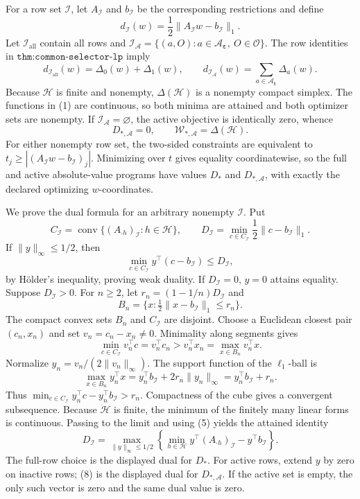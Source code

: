 For a row set \(\mathcal I\), let \(A_{\mathcal I}\) and \(b_{\mathcal I}\) be the corresponding restrictions and define
\[
d_{\mathcal I}(w)=\frac12\lVert A_{\mathcal I}w-b_{\mathcal I}\rVert_1.
\tag{1}
\]
Let \(\mathcal I_{\mathrm{all}}\) contain all rows and \(\mathcal I_{\mathcal A}=\{(a,O):a\in\mathcal A_{\boldsymbol\varepsilon},\ O\in\mathcal O\}\). The row identities in \(\texttt{thm:common-selector-lp}\) imply
\[
d_{\mathcal I_{\mathrm{all}}}(w)=\Delta_0(w)+\Delta_1(w),\qquad d_{\mathcal I_{\mathcal A}}(w)=\sum_{a\in\mathcal A_{\boldsymbol\varepsilon}}\Delta_a(w).
\tag{2}
\]
Because \(\mathcal H\) is finite and nonempty, \(\Delta(\mathcal H)\) is a nonempty compact simplex. The functions in (1) are continuous, so both minima are attained and both optimizer sets are nonempty. If \(\mathcal I_{\mathcal A}=\varnothing\), the active objective is identically zero, whence
\[
D_{*,\mathcal A}=0,\qquad \mathcal W_{*,\mathcal A}=\Delta(\mathcal H).
\tag{3}
\]
For either nonempty row set, the two-sided constraints are equivalent to \(t_j\ge |(A_{\mathcal I}w-b_{\mathcal I})_j|\). Minimizing over \(t\) gives equality coordinatewise, so the full and active absolute-value programs have values \(D_*\) and \(D_{*,\mathcal A}\), with exactly the declared optimizing \(w\)-coordinates.

We prove the dual formula for an arbitrary nonempty \(\mathcal I\). Put
\[
C_{\mathcal I}=\operatorname{conv}\{(A_{\cdot h})_{\mathcal I}:h\in\mathcal H\},\qquad D_{\mathcal I}=\min_{c\in C_{\mathcal I}}\frac12\lVert c-b_{\mathcal I}\rVert_1.
\tag{4}
\]
If \(\lVert y\rVert_\infty\le1/2\), then
\[
\min_{c\in C_{\mathcal I}}y^\top(c-b_{\mathcal I})\le D_{\mathcal I},
\tag{5}
\]
by Hölder's inequality, proving weak duality. If \(D_{\mathcal I}=0\), \(y=0\) attains equality. Suppose \(D_{\mathcal I}>0\). For \(n\ge2\), let \(r_n=(1-1/n)D_{\mathcal I}\) and
\[
B_n=\{x:\tfrac12\lVert x-b_{\mathcal I}\rVert_1\le r_n\}.
\]
The compact convex sets \(B_n\) and \(C_{\mathcal I}\) are disjoint. Choose a Euclidean closest pair \((c_n,x_n)\) and set \(v_n=c_n-x_n\ne0\). Minimality along segments gives
\[
\min_{c\in C_{\mathcal I}}v_n^\top c=v_n^\top c_n>v_n^\top x_n=\max_{x\in B_n}v_n^\top x.
\tag{6}
\]
Normalize \(y_n=v_n/(2\lVert v_n\rVert_\infty)\). The support function of the \(\ell_1\)-ball is
\[
\max_{x\in B_n}y_n^\top x=y_n^\top b_{\mathcal I}+2r_n\lVert y_n\rVert_\infty=y_n^\top b_{\mathcal I}+r_n.
\tag{7}
\]
Thus \(\min_{c\in C_{\mathcal I}}y_n^\top c-y_n^\top b_{\mathcal I}>r_n\). Compactness of the cube gives a convergent subsequence. Because \(\mathcal H\) is finite, the minimum of the finitely many linear forms is continuous. Passing to the limit and using (5) yields the attained identity
\[
D_{\mathcal I}=\max_{\lVert y\rVert_\infty\le1/2}\left\{\min_{h\in\mathcal H}y^\top(A_{\cdot h})_{\mathcal I}-y^\top b_{\mathcal I}\right\}.
\tag{8}
\]
The full-row choice is the displayed dual for \(D_*\). For active rows, extend \(y\) by zero on inactive rows; (8) is the displayed dual for \(D_{*,\mathcal A}\). If the active set is empty, the only such vector is zero and the same dual value is zero.

